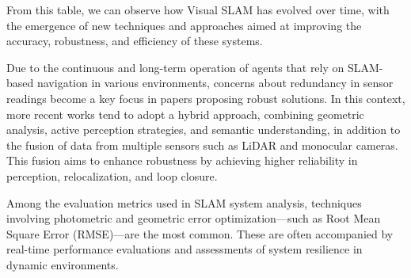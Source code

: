 \documentclass[a4paper,12pt]{article}
\begin{document}
From this table, we can observe how Visual SLAM has evolved over time, with the emergence of new techniques and approaches aimed at improving the accuracy, robustness, and efficiency of these systems.

Due to the continuous and long-term operation of agents that rely on SLAM-based navigation in various environments, concerns about redundancy in sensor readings become a key focus in papers proposing robust solutions. In this context, more recent works tend to adopt a hybrid approach, combining geometric analysis, active perception strategies, and semantic understanding, in addition to the fusion of data from multiple sensors such as LiDAR and monocular cameras. This fusion aims to enhance robustness by achieving higher reliability in perception, relocalization, and loop closure.

Among the evaluation metrics used in SLAM system analysis, techniques involving photometric and geometric error optimization—such as Root Mean Square Error (RMSE)—are the most common. These are often accompanied by real-time performance evaluations and assessments of system resilience in dynamic environments.



\end{document}
